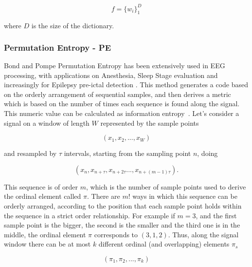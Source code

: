 \begin{equation}
f =  {\bigg \{ w_{i} \bigg \}}_{1}^{D} 
\label{eq:mp6}
\end{equation}

\noindent where $D$ is the size of the dictionary.  



\subsubsection{Permutation Entropy - PE}

Bond and Pompe Permutation Entropy has been extensively used in EEG processing, with applications on Anesthesia, Sleep Stage evaluation and increasingly for Epilepsy pre-ictal detection \cite{Bandt2002}.  This method generates a code based on the orderly arrangement of sequential samples, and then derives a metric which is based on the number of times each sequence is found along the signal.  This numeric value can be calculated as information entropy~\cite{Nicolaou2010}. Let's consider a signal on a window of length $W$ represented by the sample points

\begin{equation}
(x_1,x_2,...,x_{W})
\label{eq:pesignal}
\end{equation}

\noindent and resampled by $\tau$ intervals, starting from the sampling point $n$, doing

\begin{equation}
(x_n,x_{n+\tau},x_{n+2 \tau}...,x_{n+(m-1)\tau}).
\label{eq:pe2}
\end{equation}

This sequence is of order $m$, which is the number of sample points used to derive the ordinal element called $\pi$. There are $m!$ ways in which this sequence can be orderly arranged, according to the position that each sample point holds within the sequence in a strict order relationship.  For example if $m=3$, and the first sample point is the bigger, the second is the smaller and the third one is in the middle, the ordinal element $\pi$ corresponds to $(3,1,2)$. Thus, along the signal window there can be at most $k$ different ordinal (and overlapping) elements $\pi_{s}$

\begin{equation}
(\pi_{1},\pi_{2},...,\pi_{k})
\label{eq:pe3}
\end{equation}

